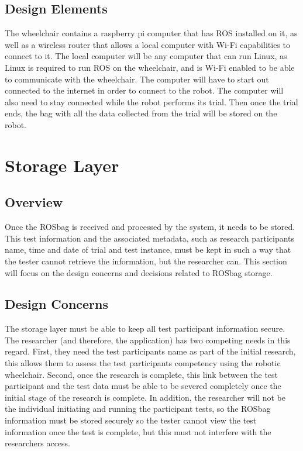 \documentclass[onecolumn, draftclsnofoot,10pt, compsoc]{report}
\begin{document}
\subsection{Design Elements}
The wheelchair contains a raspberry pi computer that has ROS installed on it, as well as a wireless router that allows a local computer with Wi-Fi capabilities to connect to it. The local computer will be any computer that can run Linux, as Linux is required to run ROS on the wheelchair, and is Wi-Fi enabled to be able to communicate with the wheelchair. The computer will have to start out connected to the internet in order to connect to the robot. The computer will also need to stay connected while the robot performs its trial. Then once the trial ends, the bag with all the data collected from the trial will be stored on the robot.

\section{Storage Layer}
\subsection{Overview}
Once the ROSbag is received and processed by the system, it needs to be stored. This test information and the associated metadata, such as research participants name, time and date of trial and test instance, must be kept in such a way that the tester cannot retrieve the information, but the researcher can. This section will focus on the design concerns and decisions related to ROSbag storage. 
\subsection{Design Concerns}
The storage layer must be able to keep all test participant information secure. The researcher (and therefore, the application) has two competing needs in this regard. First, they need the test participants name as part of the initial research, this allows them to assess the test participants competency using the robotic wheelchair. Second, once the research is complete, this link between the test participant and the test data must be able to be severed completely once the initial stage of the research is complete. In addition, the researcher will not be the individual initiating and running the participant tests, so the ROSbag information must be stored securely so the tester cannot view the test information once the test is complete, but this must not interfere with the researchers access. 
\end{document}
